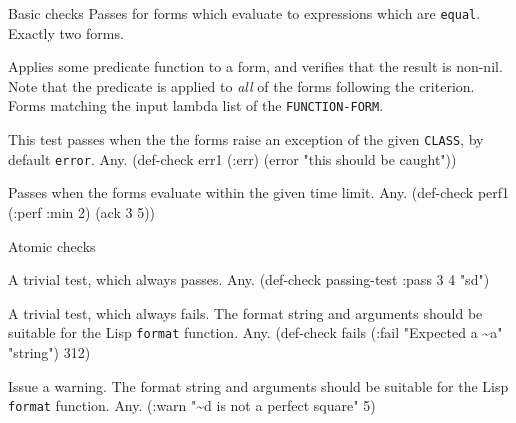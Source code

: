 \begin{criteriaGroup}{Basic checks}
{Passes for forms which evaluate to expressions which are
\texttt{equal}.}
{Exactly two forms.}
{\noEx}{}

{Applies some predicate function to a form, and verifies that the
result is non-nil.  Note that the predicate is applied to \emph{all}
of the forms following the criterion.}
{Forms matching the input lambda list of the \texttt{FUNCTION-FORM}.}
{\multiEx}
{
 }

{This test passes when the the forms raise an exception of the given
\texttt{CLASS}, by default \texttt{error}.}
{Any.}
{\singleEx}{(def-check err1 (:err) (error "this should be caught"))}

{Passes when the forms evaluate within the given time limit.}
{Any.}
{\singleEx}{(def-check perf1 (:perf :min 2) (ack 3 5))}

\end{criteriaGroup}

\begin{criteriaGroup}{Atomic checks}

{A trivial test, which always passes.}
{Any.}
{\singleEx}{(def-check passing-test :pass 3 4 "sd")}

{A trivial test, which always fails.  The format string and arguments
should be suitable for the Lisp \texttt{format} function.}
{Any.}
{\singleEx}{(def-check fails (:fail "Expected a \~{}a" "string") 312)}

{Issue a warning.  The format string and arguments should be suitable for
 the Lisp \texttt{format} function.}
{Any.}
{\singleEx}{(:warn "\~{}d is not a perfect square" 5)}

\end{criteriaGroup}

